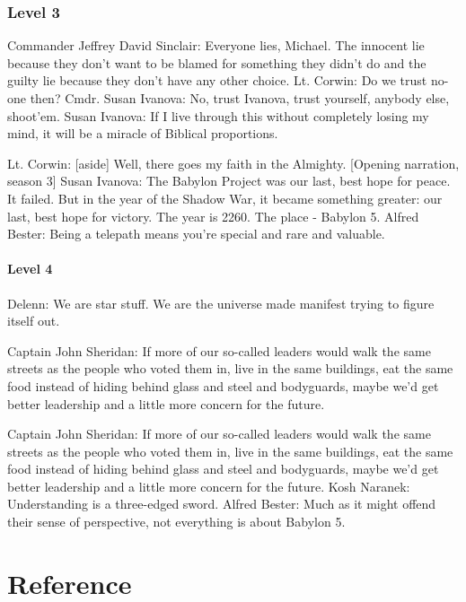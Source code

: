 \documentclass[
  10pt,
  twoside]{article}
\begin{document}
\hypertarget{level-3}{%
\subsubsection{Level 3}\label{level-3}}

Commander Jeffrey David Sinclair: Everyone lies, Michael. The innocent lie because they don't want to be blamed for something they didn't do and the guilty lie because they don't have any other choice. Lt. Corwin: Do we trust no-one then? Cmdr. Susan Ivanova: No, trust Ivanova, trust yourself, anybody else, shoot'em. Susan Ivanova: If I live through this without completely losing my mind, it will be a miracle of Biblical proportions.

Lt. Corwin: {[}aside{]} Well, there goes my faith in the Almighty. {[}Opening narration, season 3{]} Susan Ivanova: The Babylon Project was our last, best hope for peace. It failed. But in the year of the Shadow War, it became something greater: our last, best hope for victory. The year is 2260. The place - Babylon 5. Alfred Bester: Being a telepath means you're special and rare and valuable.

\hypertarget{level-4}{%
\paragraph{Level 4}\label{level-4}}

Delenn: We are star stuff. We are the universe made manifest trying to figure itself out.

Captain John Sheridan: If more of our so-called leaders would walk the same streets as the people who voted them in, live in the same buildings, eat the same food instead of hiding behind glass and steel and bodyguards, maybe we'd get better leadership and a little more concern for the future.

Captain John Sheridan: If more of our so-called leaders would walk the same streets as the people who voted them in, live in the same buildings, eat the same food instead of hiding behind glass and steel and bodyguards, maybe we'd get better leadership and a little more concern for the future. Kosh Naranek: Understanding is a three-edged sword. Alfred Bester: Much as it might offend their sense of perspective, not everything is about Babylon 5.

\hypertarget{reference}{%
\section*{Reference}\label{reference}}
\end{document}
